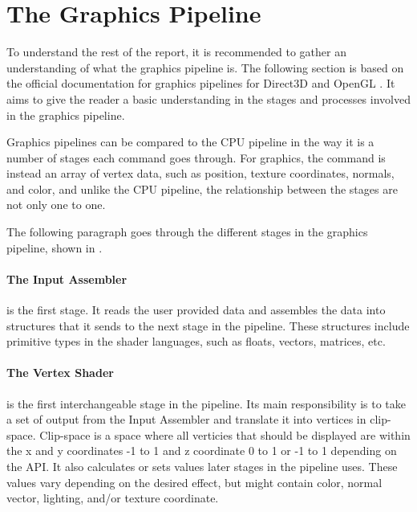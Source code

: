 \section{The Graphics Pipeline} \label{sec:pipeline}
\begin{sectionmeta}
To understand the rest of the report, it is recommended to gather an understanding of what the graphics pipeline is.
The following section is based on the official documentation for graphics pipelines for Direct3D and OpenGL \cite{khronos????pipeline, microsoft????pipeline}.
It aims to give the reader a basic understanding in the stages and processes involved in the graphics pipeline.
\end{sectionmeta}

Graphics pipelines can be compared to the \gls{CPU} pipeline in the way it is a number of stages each command goes through.
For graphics, the command is instead an array of vertex data, such as position, texture coordinates, normals, and color, and unlike the \gls{CPU} pipeline, the relationship between the stages are not only one to one.


The following paragraph goes through the different stages in the graphics pipeline, shown in .

\paragraph{The Input Assembler} is the first stage. 
It reads the user provided data and assembles the data into structures that it sends to the next stage in the pipeline. 
These structures include primitive types in the shader languages, such as floats, vectors, matrices, etc.

\paragraph{The Vertex Shader} is the first interchangeable stage in the pipeline.
Its main responsibility is to take a set of output from the Input Assembler and translate it into vertices in clip-space.
Clip-space is a space where all verticies that should be displayed are within the x and y coordinates -1 to 1 and z coordinate 0 to 1 or -1 to 1 depending on the \gls{API}.
It also calculates or sets values later stages in the pipeline uses.
These values vary depending on the desired effect, but might contain color, normal vector, lighting, and/or texture coordinate.

